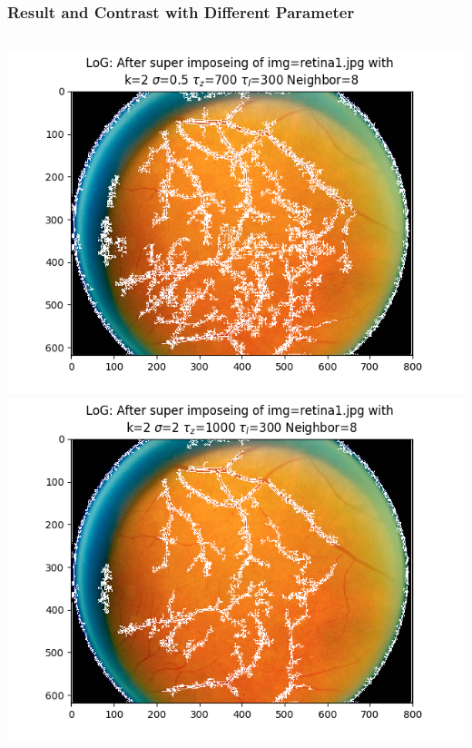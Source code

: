 \documentclass[11pt]{beamer}
\begin{document}
\begin{frame}
\frametitle{Result and Contrast with Different Parameter}
\begin{columns}[T] %
\begin{column}{\textwidth}
\centering
\includegraphics[width=.45\textwidth, height=.45\textheight]{log_fig/retina1.jpg_fig6_0.png}\vspace{1pt}
\includegraphics[width=.45\textwidth, height=.45\textheight]{log_fig/retina1.jpg_fig6_4.png}\vfill
\end{column}
\end{columns}\vfill
\end{frame}
\end{document}
